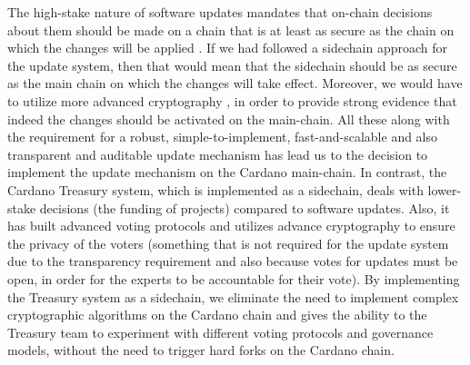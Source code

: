 The high-stake nature of software updates mandates that on-chain decisions 
about them should be made on a chain that is at least as secure as the chain on 
which the changes will be applied . If we had followed a sidechain approach for 
the 
update system, then that would mean that the sidechain should be as secure as 
the main chain on which the changes will take effect. Moreover, we would have 
to utilize more advanced cryptography 
\cite{sidechain}, in order to provide strong evidence that indeed the 
changes should be activated on the main-chain. All these along with the 
requirement for a 
robust, simple-to-implement, fast-and-scalable and also transparent and 
auditable update mechanism has lead us to the decision to implement the update 
mechanism on the Cardano main-chain. In contrast, the Cardano Treasury system, 
which is implemented as a sidechain, deals with lower-stake decisions (the 
funding of projects) compared to software updates. Also, it has built advanced 
voting protocols and utilizes advance cryptography to ensure 
the privacy of the voters (something that is not required for the update system 
due to the transparency requirement and also because votes for 
updates must be open, in order for the experts to be accountable for their 
vote). By implementing the Treasury system as a sidechain, 
we eliminate the need to implement complex cryptographic algorithms on the 
Cardano chain and gives the ability to the Treasury team to experiment with 
different voting protocols and governance models, without the need to trigger 
hard forks on the Cardano chain.

